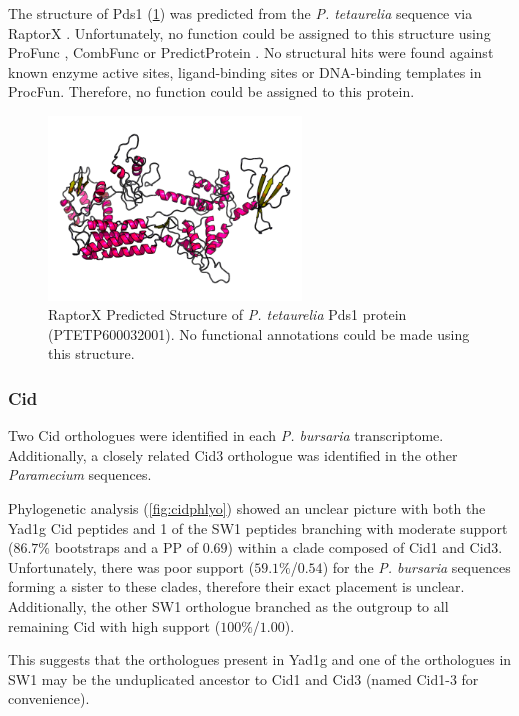 The structure of Pds1 (\cref{fig:pds1_struct}) was predicted 
from the \textit{P. tetaurelia}
sequence via RaptorX \citep{Kallberg2012}.  Unfortunately,
no function could be assigned to this structure using ProFunc \citep{Laskowski2005},
CombFunc \citep{Wass2012} or PredictProtein \citep{Rost2004}.
No structural hits were found against known enzyme active sites, ligand-binding
sites or DNA-binding templates in ProcFun.
Therefore, no function could be assigned to this protein.

\begin{figure}
    \centering
    \includegraphics[width=0.6\textwidth]{psd1_struct.png}
    \caption[Predicted structure of Pds1]{RaptorX Predicted Structure of \textit{P. tetaurelia}
    Pds1 protein (PTETP600032001). No functional annotations could be made using this structure.}
    \label{fig:pds1_struct}
\end{figure}

\subsubsection{Cid}

Two Cid orthologues were identified in each \textit{P. bursaria}
transcriptome.  Additionally, a closely related Cid3 orthologue
was identified in the other \textit{Paramecium} sequences.

Phylogenetic analysis (\cref{fig:cidphlyo}) showed an unclear
picture with both the Yad1g Cid peptides and 1 of the SW1 peptides
branching with moderate support (\(86.7\%\) bootstraps and
a PP of \(0.69\)) within a 
clade composed of Cid1 and Cid3.  Unfortunately, there was
poor support (\(59.1\%\)/\(0.54\)) for the \textit{P. bursaria}
sequences forming a sister to these clades, therefore
their exact placement is unclear.
Additionally, the other
SW1 orthologue branched as the outgroup to all remaining Cid
with high support (\(100\%\)/\(1.00\)). 

This suggests that the orthologues present in Yad1g and one of
the orthologues in SW1 may be the unduplicated ancestor
to Cid1 and Cid3 (named Cid1-3 for convenience).


